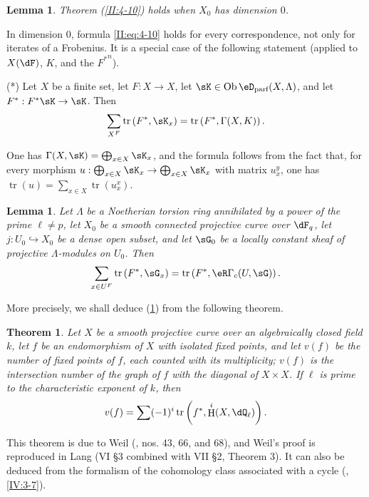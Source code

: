 \documentclass[12pt,oneside,english]{smfbook}
\DeclareMathOperator{\h}{H}
\DeclareMathOperator{\ob}{Ob}
\DeclareMathOperator{\tr}{tr}
\newcounter{char}
\newtheorem{lemma_}[subsection]{Lemma}
\newtheorem{theorem_}[subsection]{Theorem}
\begin{document}
\begin{lemma_}\label{II:5-1}
Theorem (\ref{II:4-10}) holds when $X_0$ has dimension $0$.
\end{lemma_}

In dimension $0$, formula \eqref{II:eq:4-10} holds for every correspondence, not only for iterates of a Frobenius. It is a special case of the following statement (applied to $X(\dF)$, $K$, and the ${F^*}^n$).

(*) Let $X$ be a finite set, let $F:X\to X$, let $\sK\in\ob\eD_\text{parf}(X,\Lambda)$, and let $F^*:F^*\sK\to\sK$. Then
\[
  \sum_{X^F} \tr\left(F^*,\sK_x\right) = \tr\left(F^*,\Gamma(X,K)\right) \text{.}
\]

One has $\Gamma(X,\sK)=\bigoplus_{x\in X}\sK_x$, and the formula follows from the fact that, for every morphism $u:\bigoplus_{x\in X}\sK_x\to\bigoplus_{x\in X}\sK_x$ with matrix $u_x^y$, one has $\tr(u)=\sum_{x\in X}\tr(u_x^x)$.

\begin{lemma_}\label{II:5-2}
Let $\Lambda$ be a Noetherian torsion ring annihilated by a power of the prime $\ell\ne p$, let $X_0$ be a smooth connected projective curve over $\dF_q$, let $j:U_0\hookrightarrow X_0$ be a dense open subset, and let $\sG_0$ be a locally constant sheaf of projective $\Lambda$-modules on $U_0$. Then
\[
  \sum_{x\in U^F} \tr\left(F^*,\sG_x\right) = \tr\left(F^*,\eR\Gamma_c(U,\sG)\right) \text{.}
\]
\end{lemma_}

More precisely, we shall deduce (\ref{II:5-2}) from the following theorem.

\begin{theorem_}\label{II:5-3}
Let $X$ be a smooth projective curve over an algebraically closed field $k$, let $f$ be an endomorphism of $X$ with isolated fixed points, and let $v(f)$ be the number of fixed points of $f$, each counted with its multiplicity; $v(f)$ is the intersection number of the graph of $f$ with the diagonal of $X\times X$. If $\ell$ is prime to the characteristic exponent of $k$, then
\[
  v(f) = \sum (-1)^i \tr\left(f^*,\h^i(X,\dQ_\ell)\right) \text{.}
\]
\end{theorem_}

This theorem is due to Weil (\cite{we48}, nos. 43, 66, and 68), and Weil's proof is reproduced in Lang \cite{la83} (VI \S3 combined with VII \S2, Theorem 3). It can also be deduced from the formalism of the cohomology class associated with a cycle (, \ref{IV:3-7}).
\end{document}
